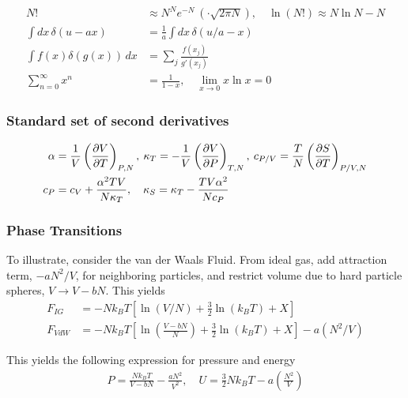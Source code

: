 \documentclass[a4paper, english, 12pt]{article}
\newcommand{\closed}[1]{\left( #1 \right)}
\newcommand{\bracket}[1]{\left[ #1 \right]}
\begin{document}
\tiny
\begin{multicols*}{2}


\subsubsection*{}
\begin{align*}
  N! & \approx N^N e^{-N}\:(\cdot \sqrt{2\pi N}),\quad  \ln{(N!)}  \approx N\ln{N}-N \\
  \int dx\,\delta(u-ax) &= \frac{1}{a}\int dx\,\delta(u/a - x) \\ 
  \int f(x)\delta(g(x))\,dx &= \sum_j \frac{f(x_j)}{g'(x_j)} \\
  \sum_{n=0}^\infty x^n &= \frac{1}{1-x},\quad \lim_{x\to0} x\ln x = 0
\end{align*}

\subsubsection*{\scriptsize Standard set of second derivatives}
\begin{align*}
    \alpha &= \frac{1}{V}\left(\pdv{V}{T} \right)_{P,N},\: \kappa_T = -\frac{1}{V}\left(\pdv{V}{P} \right)_{T,N},\: c_{P/V} = \frac{T}{N}\left(\pdv{S}{T} \right)_{P/V,N} \\
    c_P &= c_V + \frac{\alpha^2 TV}{N\kappa_T},\quad \kappa_S = \kappa_T - \frac{TV \alpha^2}{Nc_P}
\end{align*}


\subsubsection*{\scriptsize Phase Transitions}
To illustrate, consider the van der Waals Fluid. From ideal gas, add attraction term, $-a N^2/V$, for neighboring particles, and restrict volume due to hard particle spheres, $V\to V-bN$. This yields 
\begin{align*}
    F_{IG} &= -N k_B T \bracket{\ln(V/N) + \frac{3}{2}\ln(k_B T)+X} \\ 
    F_{VdW} &= - N k_B T \bracket{\ln\closed{\frac{V-bN}{N}} + \frac{3}{2}\ln(k_B T)+X} - a(N^2/V)
\end{align*}

This yields the following expression for pressure and energy 
\begin{align*}
    P = \frac{Nk_B T}{V - bN} - \frac{a N^2}{V^2},\quad U = \frac{3}{2}N k_B T - a \closed{\frac{N^2}{V}}
\end{align*}



\end{multicols*}
\end{document}
